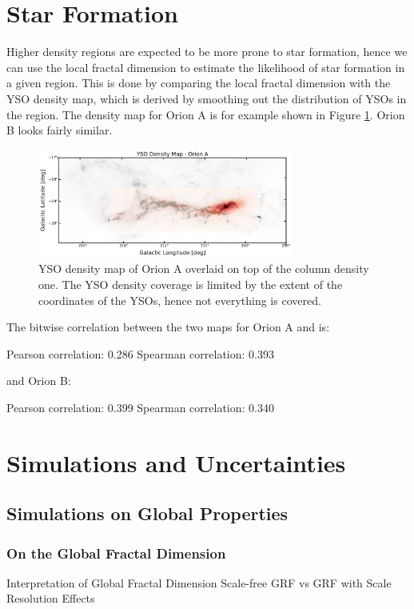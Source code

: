\section{Star Formation}

Higher density regions are expected to be more prone to star formation, hence we can use the local fractal dimension to estimate the likelihood of star formation in a given region. 
This is done by comparing the local fractal dimension with the YSO density map, which is derived by smoothing out the distribution of YSOs in the region. 
The density map for Orion A is for example shown in Figure \ref{fig:YSOs_density_Map_A}.  Orion B looks fairly similar.

\begin{figure}[t]
    \centering
    \includegraphics[width=0.75\textwidth]{figures/YSOs_density_Orion_A.png}
    \caption{YSO density map of Orion A overlaid on top of the column density one. The YSO density coverage is limited by the extent of the coordinates of the YSOs, hence not everything is covered.}
    \label{fig:YSOs_density_Map_A}
\end{figure}

The bitwise correlation between the two maps for Orion A and is:

Pearson correlation: 0.286 
Spearman correlation: 0.393 

and Orion B:

Pearson correlation: 0.399
Spearman correlation: 0.340

\section{Simulations and Uncertainties}

\subsection{Simulations on Global Properties}

\subsubsection{On the Global Fractal Dimension}
Interpretation of Global Fractal Dimension
Scale-free GRF vs GRF with Scale
Resolution Effects

